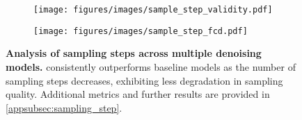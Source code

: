 \begin{figure}[ht!]
    \centering
    \setlength{\abovecaptionskip}{0pt} 
    \setlength{\belowcaptionskip}{0pt}  
    
    \begin{subfigure}[b]{0.49\textwidth} 
        \centering
        \texttt{[image: figures/images/sample\_step\_validity.pdf]}
    \end{subfigure}
    \hfill  
    \begin{subfigure}[b]{0.49\textwidth} 
        \centering
        \texttt{[image: figures/images/sample\_step\_fcd.pdf]}
    \end{subfigure}
    \caption{\textbf{Analysis of sampling steps across multiple denoising models.} \methodname{} consistently outperforms baseline models as the number of sampling steps decreases, exhibiting less degradation in sampling quality. Additional metrics and further results are provided in \cref{appsubsec:sampling_step}.}
    \label{fig:sample_step}
\end{figure}